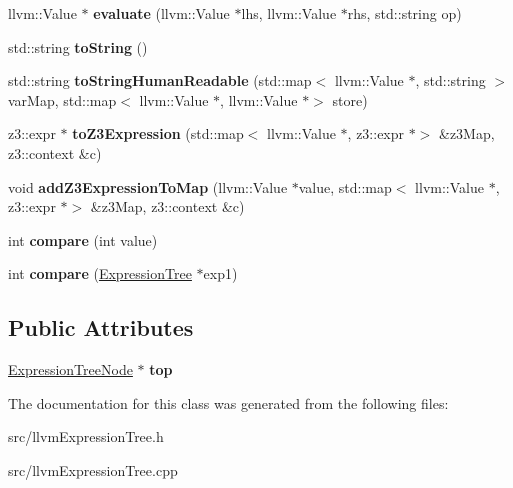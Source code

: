 \begin{DoxyCompactItemize}
\item 
llvm\+::\+Value $\ast$ {\bfseries evaluate} (llvm\+::\+Value $\ast$lhs, llvm\+::\+Value $\ast$rhs, std\+::string op)\hypertarget{classExpressionTree_a4577f2f167e215df94b5699b57d4870c}{}\label{classExpressionTree_a4577f2f167e215df94b5699b57d4870c}

\item 
std\+::string {\bfseries to\+String} ()\hypertarget{classExpressionTree_a2202fb4dd25e887acce644e67c303655}{}\label{classExpressionTree_a2202fb4dd25e887acce644e67c303655}

\item 
std\+::string {\bfseries to\+String\+Human\+Readable} (std\+::map$<$ llvm\+::\+Value $\ast$, std\+::string $>$ var\+Map, std\+::map$<$ llvm\+::\+Value $\ast$, llvm\+::\+Value $\ast$$>$ store)\hypertarget{classExpressionTree_a0655333db6a501ae55739f8cdd82b0d6}{}\label{classExpressionTree_a0655333db6a501ae55739f8cdd82b0d6}

\item 
z3\+::expr $\ast$ {\bfseries to\+Z3\+Expression} (std\+::map$<$ llvm\+::\+Value $\ast$, z3\+::expr $\ast$$>$ \&z3\+Map, z3\+::context \&c)\hypertarget{classExpressionTree_a9867ae44162ab0febc92b8e8358250c9}{}\label{classExpressionTree_a9867ae44162ab0febc92b8e8358250c9}

\item 
void {\bfseries add\+Z3\+Expression\+To\+Map} (llvm\+::\+Value $\ast$value, std\+::map$<$ llvm\+::\+Value $\ast$, z3\+::expr $\ast$$>$ \&z3\+Map, z3\+::context \&c)\hypertarget{classExpressionTree_abd345e84552bebd749522bf7aa2ce683}{}\label{classExpressionTree_abd345e84552bebd749522bf7aa2ce683}

\item 
int {\bfseries compare} (int value)\hypertarget{classExpressionTree_aeaf19bc7f4140d8e200609031f036221}{}\label{classExpressionTree_aeaf19bc7f4140d8e200609031f036221}

\item 
int {\bfseries compare} (\hyperlink{classExpressionTree}{Expression\+Tree} $\ast$exp1)\hypertarget{classExpressionTree_a1ab60a303befc341d730d239c7932621}{}\label{classExpressionTree_a1ab60a303befc341d730d239c7932621}

\end{DoxyCompactItemize}
\subsection*{Public Attributes}
\begin{DoxyCompactItemize}
\item 
\hyperlink{classExpressionTreeNode}{Expression\+Tree\+Node} $\ast$ {\bfseries top}\hypertarget{classExpressionTree_a4abcd7eb41cc2bc0a23d92c8d1e2f60f}{}\label{classExpressionTree_a4abcd7eb41cc2bc0a23d92c8d1e2f60f}

\end{DoxyCompactItemize}


The documentation for this class was generated from the following files\+:\begin{DoxyCompactItemize}
\item 
src/llvm\+Expression\+Tree.\+h\item 
src/llvm\+Expression\+Tree.\+cpp\end{DoxyCompactItemize}
